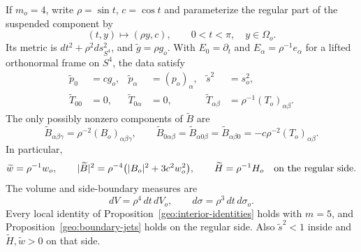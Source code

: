 \begin{proposition}\label{geo:suspension-data}
If $m_o=4$, write $\rho=\sin t$, $c=\cos t$ and parameterize the
regular part of the suspended component by
\[
 (t,y)\longmapsto (\rho y,c),\qquad
 0<t<\pi,\quad y\in\Omega_o.
\]
Its metric is $dt^2+\rho^2 ds_{S^4}^2$, and $\widetilde g=\rho g_o$.
With $E_0=\partial_t$ and $E_\alpha=\rho^{-1}e_\alpha$ for a lifted
orthonormal frame on $S^4$, the data satisfy
\begin{align}
 \widetilde p_0&=c g_o,
 &\widetilde p_\alpha&=(p_o)_\alpha,
 &\widetilde s^2&=s_o^2,
 \label{geo:suspended-first-jets}\\
 \widetilde T_{00}&=0,
 &\widetilde T_{0\alpha}&=0,
 &\widetilde T_{\alpha\beta}&=\rho^{-1}(T_o)_{\alpha\beta}.
 \label{geo:suspended-T}
\end{align}
The only possibly nonzero components of $\widetilde B$ are
\begin{equation}\label{geo:suspended-B}
 \widetilde B_{\alpha\beta\gamma}
   =\rho^{-2}(B_o)_{\alpha\beta\gamma},\qquad
 \widetilde B_{0\alpha\beta}
 =\widetilde B_{\alpha0\beta}
 =\widetilde B_{\alpha\beta0}
   =-c\rho^{-2}(T_o)_{\alpha\beta}.
\end{equation}
In particular,
\begin{equation}\label{geo:suspended-norms}
 \widetilde w=\rho^{-1}w_o,\qquad
 |\widetilde B|^2
 =\rho^{-4}\bigl(|B_o|^2+3c^2w_o^2\bigr),\qquad
 \widetilde H=\rho^{-1}H_o
 \quad\hbox{on the regular side.}
\end{equation}
The volume and side-boundary measures are
\begin{equation}\label{geo:suspended-measures}
 dV=\rho^4\,dt\,dV_o,\qquad
 d\sigma=\rho^3\,dt\,d\sigma_o.
\end{equation}
Every local identity of Proposition~\ref{geo:interior-identities}
holds with $m=5$, and Proposition~\ref{geo:boundary-jets} holds on
the regular side. Also $\widetilde s^2<1$ inside and
$\widetilde H,\widetilde w>0$ on that side.
\end{proposition}

